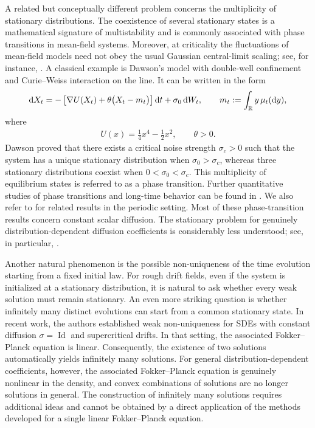 \documentclass[UTF-8,reqno]{amsart}
\numberwithin{equation}{section}
\theoremstyle{definition}
\def\dif{{\mathord{{\rm d}}}}
\def\dif{{\mathord{{\rm d}}}}
\begin{document}
A related but conceptually different problem concerns the multiplicity of
stationary distributions. The coexistence of several stationary states is a
mathematical signature of multistability and is commonly associated with phase
transitions in mean-field systems. Moreover, at criticality the fluctuations
of mean-field models need not obey the usual Gaussian central-limit scaling;
see, for instance, \cite{EN78a,EN78b,Daw83}.
A classical example is Dawson's model with double-well confinement and
Curie--Weiss interaction on the line. It can be written in the form
\begin{align}
\dif X_t
=
-
\left[
\nabla U(X_t)
+
\theta\bigl(X_t-m_t\bigr)
\right]\dif t
+
\sigma_0\,\dif W_t,
\qquad
m_t
:=
\int_{\mathbb{R}}y\,\mu_t(\dif y),\notag
\end{align}
where 
\begin{align*}
U(x)
=
\frac14x^4-\frac12x^2,
\qquad
\theta>0.
\end{align*}
Dawson \cite{Daw83} proved that there exists a critical noise strength
$\sigma_c>0$ such that the system has a unique stationary distribution when
$\sigma_0>\sigma_c$, whereas three stationary distributions coexist when
$0<\sigma_0<\sigma_c$. This multiplicity of equilibrium states is referred to
as a phase transition. Further quantitative studies of phase transitions and
long-time behavior can be found in
\cite{HT10,Tug10,Tug13,DT16}. We also refer to
\cite{CP10,CGPS20} for related results in the periodic setting.
Most of these phase-transition results concern constant scalar diffusion.  The stationary problem for genuinely
distribution-dependent diffusion coefficients is considerably less
understood; see, in particular, \cite{Zha23}.

Another natural phenomenon is the possible
non-uniqueness of the time evolution starting from a fixed initial law. For
rough drift fields, even if the system is initialized at a stationary
distribution, it is natural to ask whether every weak solution must remain
stationary.
An even more striking question is whether infinitely many distinct evolutions
can start from a common stationary state.
In recent work, the authors \cite{GG25,LRZ25,RZZ25,LR25} established weak non-uniqueness
for SDEs with constant diffusion
$\sigma=\operatorname{Id}$ and supercritical drifts.   In that setting,
the associated Fokker--Planck equation is linear. Consequently, the existence of two solutions automatically yields infinitely
many solutions. For general distribution-dependent coefficients, however, the
associated Fokker--Planck equation is genuinely nonlinear in the density, and
convex combinations of solutions are no longer solutions in general.
The construction of infinitely many solutions requires additional
ideas and cannot be obtained by a direct application of the methods developed
for a single linear Fokker--Planck equation.
 
\end{document}
